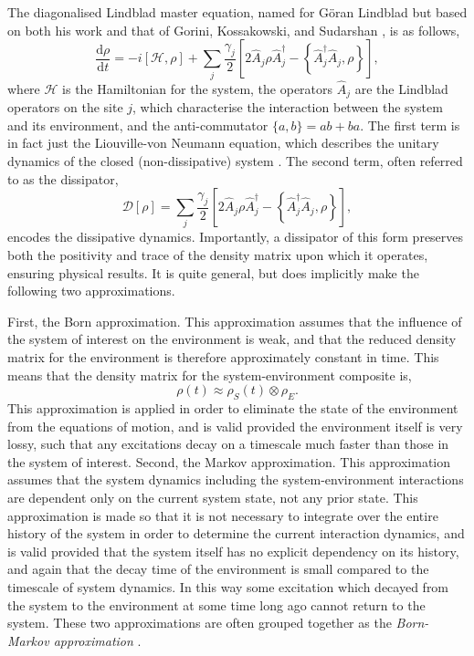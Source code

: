 The diagonalised Lindblad master equation, named for G\"{o}ran Lindblad but based on both his work and that of Gorini, Kossakowski, and Sudarshan \cite{Lindblad76,GKS76}, is as follows,
\begin{equation}
	\frac{\mathrm{d}\rho}{\mathrm{d}t} = -i [\mathcal{H}, \rho] + \sum_{j} \frac{\gamma_{j}}{2} \left[ 2\hat{A}_{j} \rho \hat{A}_{j}^{\dagger} - \left\{\hat{A}_{j}^{\dagger}\hat{A}_{j}, \rho\right\}\right],
	\label{eq:oqs3-1}
\end{equation}
where \(\mathcal{H}\) is the Hamiltonian for the system, the operators \(\hat{A}_{j}\) are the Lindblad operators on the site \(j\), which characterise the interaction between the system and its environment, and the anti-commutator \(\{a, b\} = ab + ba\). The first term is in fact just the Liouville-von Neumann equation, which describes the unitary dynamics of the closed (non-dissipative) system \cite{BP_LvN}. The second term, often referred to as the dissipator,
\begin{equation}
	\mathcal{D}[\rho] = \sum_{j}\frac{\gamma_{j}}{2}\left[2\hat{A}_{j}\rho\hat{A}_{j}^{\dagger} - \left\{\hat{A}_{j}^{\dagger}\hat{A}_{j}, \rho\right\}\right],
	\label{eq:oqs3-2}
\end{equation}
encodes the dissipative dynamics. Importantly, a dissipator of this form preserves both the positivity and trace of the density matrix upon which it operates, ensuring physical results. It is quite general, but does implicitly make the following two approximations.

First, the Born approximation. This approximation assumes that the influence of the system of interest on the environment is weak, and that the reduced density matrix for the environment is therefore approximately constant in time. This means that the density matrix for the system-environment composite is,
\begin{equation}
	\rho(t) \approx \rho_{S}(t) \otimes \rho_{E}.
	\label{eq:oqs3-3}
\end{equation} 
This approximation is applied in order to eliminate the state of the environment from the equations of motion, and is valid provided the environment itself is very lossy, such that any excitations decay on a timescale much faster than those in the system of interest. Second, the Markov approximation. This approximation assumes that the system dynamics including the system-environment interactions are dependent only on the current system state, not any prior state. This approximation is made so that it is not necessary to integrate over the entire history of the system in order to determine the current interaction dynamics, and is valid provided that the system itself has no explicit dependency on its history, and again that the decay time of the environment is small compared to the timescale of system dynamics. In this way some excitation which decayed from the system to the environment at some time long ago cannot return to the system. These two approximations are often grouped together as the \emph{Born-Markov approximation} \cite{BP_BMS}.

